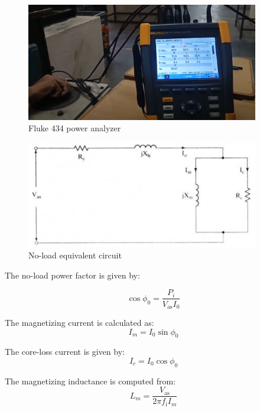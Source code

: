 
\begin{figure}[H]
	\centering
	\includegraphics[width=4in]{sections/section5/images/ParamEstim/FlukeVoltAmpHertz.png}
	\caption{Fluke 434 power analyzer}
	\label{fig:fluke434}
\end{figure}


\begin{figure}[H]
	\centering
	\includegraphics[width=4in]{sections/section5/images/ParamEstim/noloadCircuitKrish.png}
	\caption{No-load equivalent circuit}
	\label{fig:no_load_test}
\end{figure}

The no-load power factor is given by:

\begin{equation}
\cos \phi_0 = \frac{P_i}{V_\text{as}I_0}
\end{equation}

The magnetizing current is calculated as:
\begin{equation}
I_m = I_0 \sin \phi_0
\end{equation}

The core-loss current is given by:
\begin{equation}
I_c = I_0 \cos \phi_0
\end{equation}

The magnetizing inductance is computed from:
\begin{equation}
L_m = \frac{V_\text{as}}{2\pi f_\text{i}I_m}
\end{equation}

